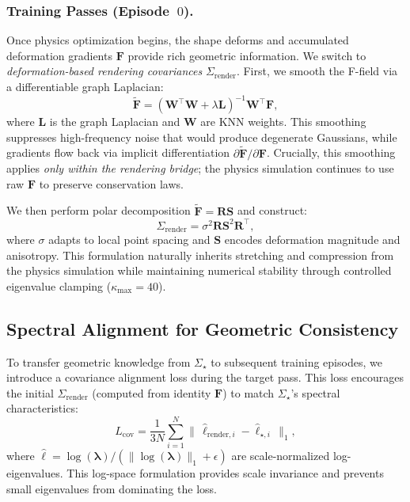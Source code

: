     \subsubsection{Training Passes (Episode $ \>  0$).}
    Once physics optimization begins, the shape deforms and accumulated deformation gradients $\mathbf{F}$ provide rich geometric information. We switch to \emph{deformation-based rendering covariances} $\Sigma_{\text{render}}$. First, we smooth the F-field via a differentiable graph Laplacian:
    \begin{equation}
    \label{eq:F_smooth}
    \tilde{\mathbf{F}} = (\mathbf{W}^\top \mathbf{W} + \lambda \mathbf{L})^{-1} \mathbf{W}^\top \mathbf{F},
    \end{equation}
    where $\mathbf{L}$ is the graph Laplacian and $\mathbf{W}$ are KNN weights. This smoothing suppresses high-frequency noise that would produce degenerate Gaussians, while gradients flow back via implicit differentiation $\partial \tilde{\mathbf{F}}/\partial \mathbf{F}$. Crucially, this smoothing applies \emph{only within the rendering bridge}; the physics simulation continues to use raw $\mathbf{F}$ to preserve conservation laws.
    
    We then perform polar decomposition $\tilde{\mathbf{F}}=\mathbf{R}\mathbf{S}$ and construct:
    \begin{equation}
    \label{eq:sigma_render}
    \Sigma_{\text{render}} = \sigma^2 \mathbf{R} \mathbf{S}^2 \mathbf{R}^\top,
    \end{equation}
    where $\sigma$ adapts to local point spacing and $\mathbf{S}$ encodes deformation magnitude and anisotropy. This formulation naturally inherits stretching and compression from the physics simulation while maintaining numerical stability through controlled eigenvalue clamping ($\kappa_{\max}=40$).

\subsection{Spectral Alignment for Geometric Consistency}

    To transfer geometric knowledge from $\Sigma_\star$ to subsequent training episodes, we introduce a covariance alignment loss during the target pass. This loss encourages the initial $\Sigma_{\text{render}}$ (computed from identity $\mathbf{F}$) to match $\Sigma_\star$'s spectral characteristics:
    \begin{equation}
    \label{eq:logspec}
    L_{\text{cov}} = \frac{1}{3N}\sum_{i=1}^N \big\|\,\hat{\ell}_{\text{render},i} - \hat{\ell}_{\star,i}\,\big\|_1,
    \end{equation}
    where $\hat{\ell} = \log(\boldsymbol{\lambda})/(\|\log(\boldsymbol{\lambda})\|_1 + \epsilon)$ are scale-normalized log-eigenvalues. This log-space formulation provides scale invariance and prevents small eigenvalues from dominating the loss.
    
